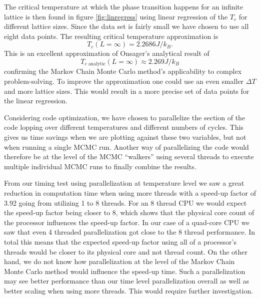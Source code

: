 \documentclass[english,notitlepage,reprint,nofootinbib]{revtex4-1}  %
\begin{document}
The critical temperature at which the phase transition happens for an infinite lattice is then found in figure \ref{fig:linregress} using linear regression of the $T_c$ for different lattice sizes. Since the data set is fairly small we have chosen to use all eight data points. The resulting critical temperature approximation is
\begin{equation}
    T_c(L=\infty) = 2.2686 J/k_B.
\end{equation}
This is an excellent approximation of Onsager's analytical result of
\begin{equation}
    T_{c \text{ analytic}}(L=\infty) \approx 2.269 J/k_B
\end{equation}
confirming the Markov Chain Monte Carlo method's applicability to complex problem-solving. To improve the approximation one could use an even smaller $\Delta T$ and more lattice sizes. This would result in a more precise set of data points for the linear regression.

Considering code optimization, we have chosen to parallelize the section of the code lopping over different temperatures and different numbers of cycles. This gives us time savings when we are plotting against these two variables, but not when running a single MCMC run. Another way of parallelizing the code would therefore be at the level of the MCMC ``walkers'' using several threads to execute multiple individual MCMC runs to finally combine the results.


From our timing test using parallelization at temperature level we saw a great reduction in computation time when using more threads with a speed-up factor of 3.92 going from utilizing 1 to 8 threads. For an 8 thread CPU we would expect the speed-up factor being closer to 8, which shows that the physical core count of the processor influences the speed-up factor. In our case of a quad-core CPU we saw that even 4 threaded parallelization got close to the 8 thread performance. In total this means that the expected speed-up factor using all of a processor's threads would be closer to its physical core and not thread count. On the other hand, we do not know how parallelization at the level of the Markov Chain Monte Carlo method would influence the speed-up time. Such a parallelization may see better performance than our time level parallelization overall as well as better scaling when using more threads. This would require further investigation.


\end{document}
